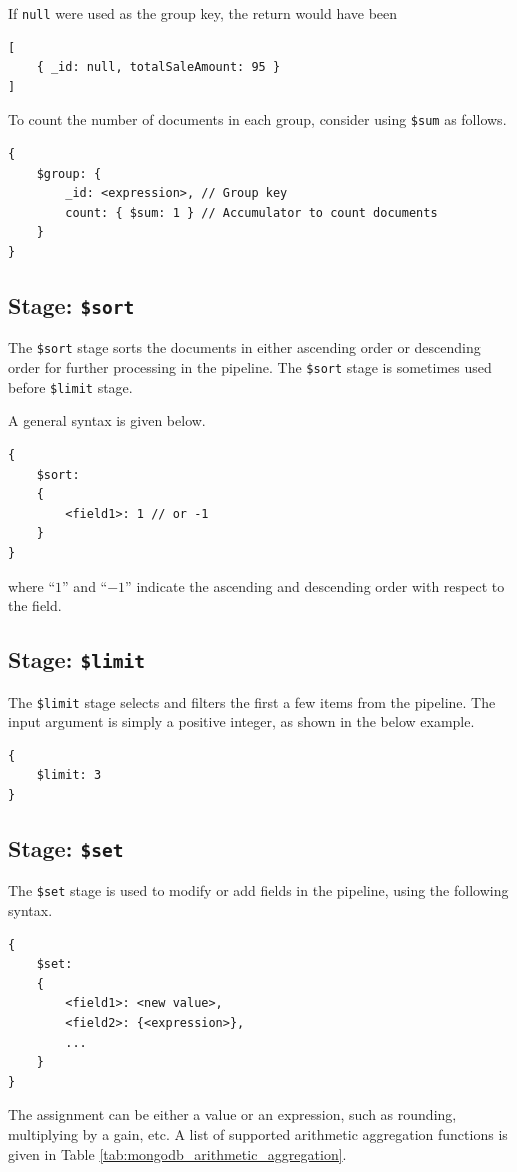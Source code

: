 If \verb|null| were used as the group key, the return would have been
\begin{lstlisting}
[
	{ _id: null, totalSaleAmount: 95 }
]
\end{lstlisting}

To count the number of documents in each group, consider using \verb|$sum| as follows.
\begin{lstlisting}
{
	$group: {
		_id: <expression>, // Group key
		count: { $sum: 1 } // Accumulator to count documents
	}
}
\end{lstlisting}

\subsection{Stage: \texttt{\$sort}}

The \verb|$sort| stage sorts the documents in either ascending order or descending order for further processing in the pipeline. The \verb|$sort| stage is sometimes used before \verb|$limit| stage.

A general syntax is given below.
\begin{lstlisting}
{
	$sort:
	{
		<field1>: 1 // or -1
	}
}
\end{lstlisting}
where ``$1$'' and ``$-1$'' indicate the ascending and descending order with respect to the field.

\subsection{Stage: \texttt{\$limit}}

The \verb|$limit| stage selects and filters the first a few items from the pipeline. The input argument is simply a positive integer, as shown in the below example.
\begin{lstlisting}
{
	$limit: 3
}
\end{lstlisting}

\subsection{Stage: \texttt{\$set}}

The \verb|$set| stage is used to modify or add fields in the pipeline, using the following syntax.
\begin{lstlisting}
{
	$set:
	{
		<field1>: <new value>,
		<field2>: {<expression>},
		...
	}
}
\end{lstlisting}
The assignment can be either a value or an expression, such as rounding, multiplying by a gain, etc. A list of supported arithmetic aggregation functions is given in Table \ref{tab:mongodb_arithmetic_aggregation}.

